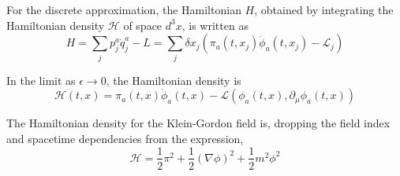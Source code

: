 \noindent For the discrete approximation, the Hamiltonian $H$, obtained by integrating the Hamiltonian density $\mathscr{H}$ of space $d^3 x$, is written as 
\begin{equation}
H = \sum_j p_j^a \dot{q}_j^a - L = \sum_j \delta x_j ( \pi_a(t, x_j) \dot{\phi}_a(t, x_j) - \mathcal{L}_j )
\end{equation}

\noindent In the limit as $\epsilon \rightarrow 0$, the Hamiltonian density is 
\begin{equation}
\mathscr{H}(t, x) = \pi_a(t, x) \dot{\phi}_a(t, x) - \mathscr{L} \left( \phi_a(t, x), \partial_\mu \phi_a(t,x) \right)
\end{equation}

\noindent The Hamiltonian density for the Klein-Gordon field is, dropping the field index and spacetime dependencies from the expression, 
\begin{equation}
\mathscr{H} = \frac{1}{2}\pi^2 + \frac{1}{2}(\nabla \phi)^2 + \frac{1}{2} m^2 \phi^2
\end{equation}

